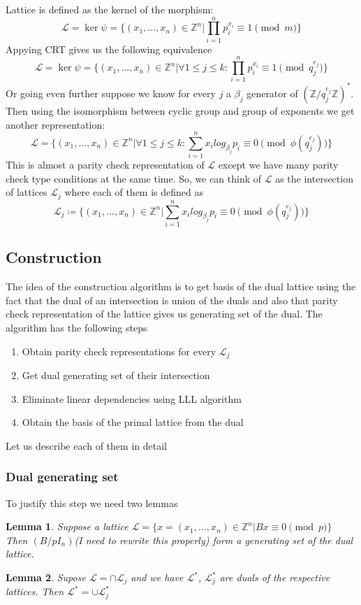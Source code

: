 \documentclass[12pt]{article}
\newcommand{\zz}{\mathbb{Z}}
\newcommand{\LL}{\mathcal{L}}
\newtheorem{lemma}{Lemma}
\begin{document}
Lattice is defined as the kernel of the morphism:
\begin{equation}
    \LL = \ker \psi = \{(x_{1}, ..., x_{n}) \in \zz^{n} | \prod_{i=1}^{n}p_{i}^{x_{i}} \equiv 1 \pmod{m}\}
\end{equation}
Appying CRT gives us the following equivalence
\begin{equation}
    \LL = \ker \psi = \{(x_{1}, ..., x_{n}) \in \zz^{n} |  \forall 1 \leq j \leq k: \prod_{i=1}^{n}p_{i}^{x_{i}} \equiv 1 \pmod{q_{j}^{e_{j}}}\}
\end{equation}
Or going even further suppose we know for every $j$ a ${\beta_{j}}$ generator of  $(\zz/q_{j}^{e_{j}}\zz)^*$. Then using the isomorphism between cyclic group and group of exponents we get another representation:
\begin{equation}
    \LL = \{(x_{1}, ..., x_{n}) \in \zz^{n} |  \forall 1 \leq j \leq k: \sum_{i=1}^{n}x_{i}log_{\beta_{j}}p_{i}\equiv 0 \pmod{\phi(q_{j}^{e_{j}})}\}
\end{equation}
This is almost a parity check representation of $\LL$ except we have many parity check type conditions at the same time. So, we can think of $\LL$ as the intersection of lattices $\LL_{j}$ where each of them is defined as
\begin{equation}
    \LL_{j} \coloneqq \{(x_{1}, ..., x_{n}) \in \zz^{n} | \sum_{i=1}^{n}x_{i}log_{\beta_{j}}p_{i}\equiv 0 \pmod{\phi(q_{j}^{e_{j}})}\}
\end{equation}

\subsection{Construction}
The idea of the construction algorithm is to get basis of the dual lattice using the fact that the dual of an intersection is union of the duals and also that parity check representation of the lattice gives us generating set of the dual. The algorithm has the following steps
\begin{enumerate}
    \item Obtain parity check representations for every $\LL_{j}$
    \item Get dual generating set of their intersection
    \item Eliminate linear dependencies using LLL algorithm
    \item Obtain the basis of the primal lattice from the dual
\end{enumerate}
Let us describe each of them in detail
\subsubsection{Dual generating set}
To justify this step we need two lemmas
\begin{lemma}
    Suppose a lattice $\LL = \{x = (x_{1}, ..., x_{n}) \in \zz^{n} | Bx \equiv 0 \pmod{p}\}$
    Then $(B/p I_{n})$(I need to rewrite this properly) form a generating set of the dual lattice.
\end{lemma}
\begin{lemma}
    Supose $\LL = \cap \LL_{j}$ and we have $\LL^{*}$, $\LL_{j}^{*}$ are duals of the respective lattices. Then $\LL^{*} = \cup \LL_{j}^{*}$
\end{lemma}
\end{document}

